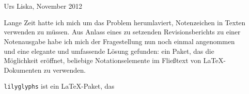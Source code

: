 \documentclass[DIV=13]{scrartcl}
\begin{document}
\section*{\centering\Huge\lilyglyphs[scale=1.5]}
\begin{flushright}
Urs Liska, November 2012
\end{flushright}
Lange Zeit hatte ich mich um das Problem herumlaviert, Notenzeichen in Texten verwenden zu müssen.
Aus Anlass eines zu setzenden Revisionsberichts zu einer Notenausgabe habe ich mich der Fragestellung nun noch einmal angenommen und eine elegante und umfassende Lösung gefunden: ein Paket, das die Möglichkeit eröffnet, beliebige Notationselemente im Fließtext von \LaTeX-Dokumenten zu verwenden.

\texttt{lilyglyphs} ist ein \LaTeX-Paket, das
\end{document}
